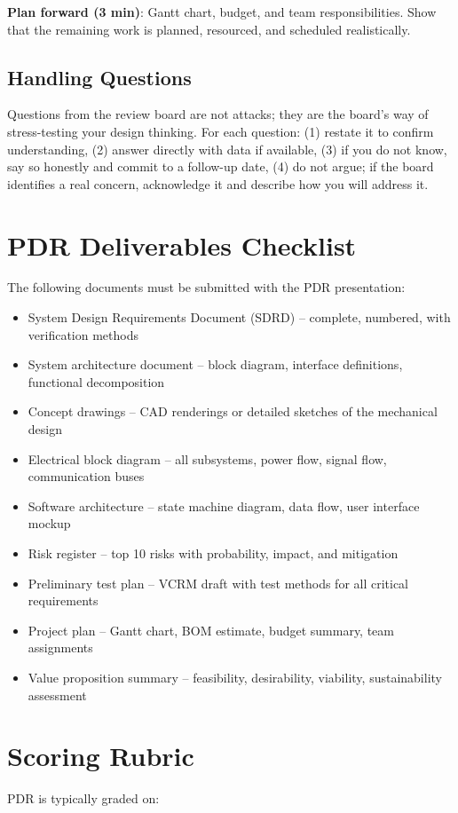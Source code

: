 \documentclass[11pt,letterpaper,twoside,openany]{book}
\begin{document}
\textbf{Plan forward (3 min)}: Gantt chart, budget, and team responsibilities. Show that the remaining work is planned, resourced, and scheduled realistically.

\subsection{Handling Questions}
Questions from the review board are not attacks; they are the board's way of stress-testing your design thinking. For each question: (1) restate it to confirm understanding, (2) answer directly with data if available, (3) if you do not know, say so honestly and commit to a follow-up date, (4) do not argue; if the board identifies a real concern, acknowledge it and describe how you will address it.

\section{PDR Deliverables Checklist}
The following documents must be submitted with the PDR presentation:

\begin{itemize}[nosep,leftmargin=1.5em]
\item System Design Requirements Document (SDRD) -- complete, numbered, with verification methods
\item System architecture document -- block diagram, interface definitions, functional decomposition
\item Concept drawings -- CAD renderings or detailed sketches of the mechanical design
\item Electrical block diagram -- all subsystems, power flow, signal flow, communication buses
\item Software architecture -- state machine diagram, data flow, user interface mockup
\item Risk register -- top 10 risks with probability, impact, and mitigation
\item Preliminary test plan -- VCRM draft with test methods for all critical requirements
\item Project plan -- Gantt chart, BOM estimate, budget summary, team assignments
\item Value proposition summary -- feasibility, desirability, viability, sustainability assessment
\end{itemize}

\section{Scoring Rubric}
PDR is typically graded on:
\end{document}
